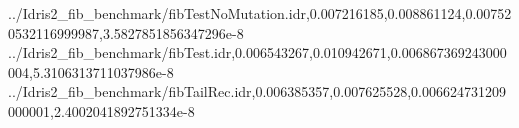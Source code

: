 \documentclass[
]{article}
\newenvironment{Shaded}{}{}
\newcommand{\DataTypeTok}[1]{\textcolor[rgb]{0.56,0.13,0.00}{#1}}
\newcommand{\FloatTok}[1]{\textcolor[rgb]{0.25,0.63,0.44}{#1}}
\newcommand{\NormalTok}[1]{#1}
\newcommand{\OperatorTok}[1]{\textcolor[rgb]{0.40,0.40,0.40}{#1}}
\begin{document}
\begin{Shaded}
\begin{Highlighting}[]
\OperatorTok{../}\DataTypeTok{Idris2\_fib\_benchmark}\OperatorTok{/}\NormalTok{fibTestNoMutation}\OperatorTok{.}\NormalTok{idr,}\FloatTok{0.007216185}\NormalTok{,}\FloatTok{0.008861124}\NormalTok{,}\FloatTok{0.007520532116999987}\NormalTok{,}\FloatTok{3.5827851856347296e{-}8}
\OperatorTok{../}\DataTypeTok{Idris2\_fib\_benchmark}\OperatorTok{/}\NormalTok{fibTest}\OperatorTok{.}\NormalTok{idr,}\FloatTok{0.006543267}\NormalTok{,}\FloatTok{0.010942671}\NormalTok{,}\FloatTok{0.006867369243000004}\NormalTok{,}\FloatTok{5.3106313711037986e{-}8}
\OperatorTok{../}\DataTypeTok{Idris2\_fib\_benchmark}\OperatorTok{/}\NormalTok{fibTailRec}\OperatorTok{.}\NormalTok{idr,}\FloatTok{0.006385357}\NormalTok{,}\FloatTok{0.007625528}\NormalTok{,}\FloatTok{0.006624731209000001}\NormalTok{,}\FloatTok{2.4002041892751334e{-}8}


\end{Highlighting}
\end{Shaded}
\end{document}
